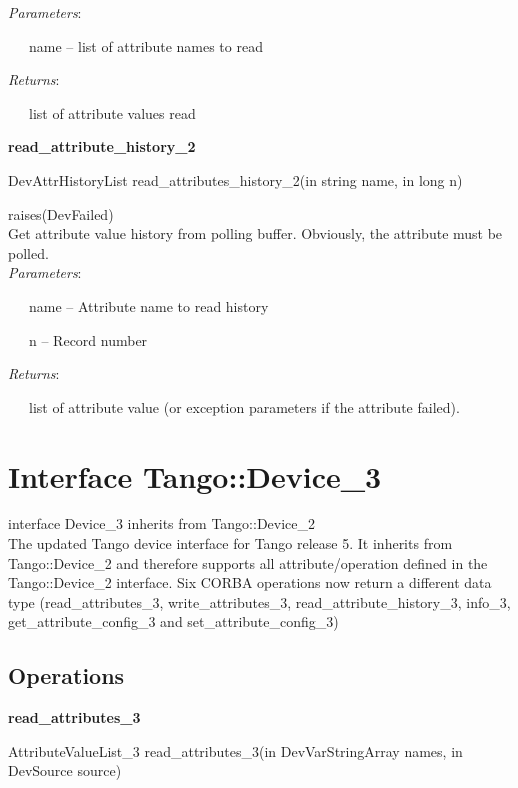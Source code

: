 \emph{Parameters}:

~~~name – list of attribute names to read

\emph{Returns}:

~~~list of attribute values read \textbf{}\\

\begin{flushleft}
\textbf{read\_attribute\_history\_2}
\par\end{flushleft}

DevAttrHistoryList read\_attributes\_history\_2(in string name, in
long n)

raises(DevFailed)\\

Get attribute value history from polling buffer. Obviously, the attribute
must be polled.\\

\emph{Parameters}:

~~~name – Attribute name to read history

~~~n – Record number

\emph{Returns}:

~~~list of attribute value (or exception parameters if the attribute
failed).\\


\section{Interface Tango::Device\_3}

interface Device\_3 inherits from Tango::Device\_2\\

The updated Tango device interface for Tango release 5. It inherits
from Tango::Device\_2 and therefore supports all attribute/operation
defined in the Tango::Device\_2 interface. Six CORBA operations now
return a different data type (read\_attributes\_3, write\_attributes\_3,
read\_attribute\_history\_3, info\_3, get\_attribute\_config\_3 and
set\_attribute\_config\_3)

\subsection{Operations}

\textbf{read\_attributes\_3}

AttributeValueList\_3 read\_attributes\_3(in DevVarStringArray names,
in DevSource source)

